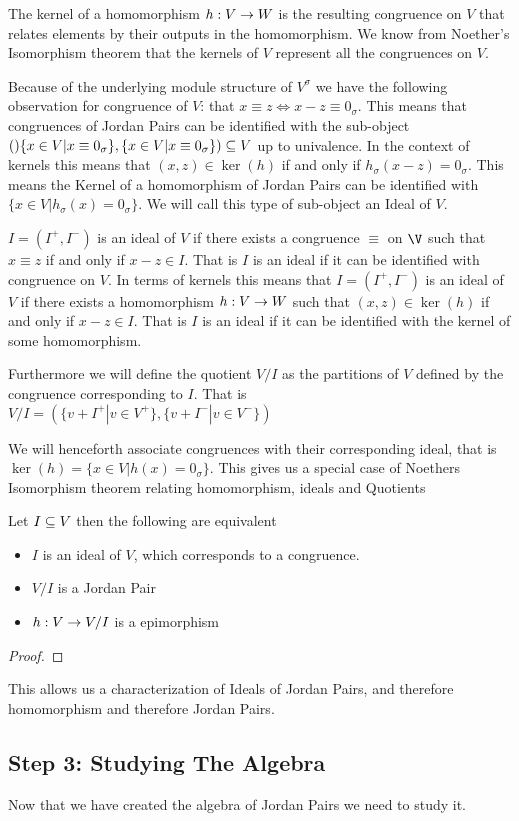 The kernel of a homomorphism $h:V\rightarrow W$ is the resulting congruence on $V$ that relates elements by their outputs in the
homomorphism. We know from Noether's Isomorphism theorem that the kernels of $V$ represent all the congruences on $V$.


Because of the underlying module structure of $V^\sigma$ we have the following observation for 
congruence of $V$: that $x\equiv z \Leftrightarrow x-z\equiv 0_\sigma$. 
This means that congruences of Jordan Pairs can be identified with the sub-object 
$()\{x\in V | x\equiv 0_\sigma\},\{x\in V | x\equiv 0_\sigma\})\subseteq V$ up to univalence. 
In the context of kernels this means that
$(x,z)\in\ker(h)$ if and only if $h_\sigma(x-z)=0_\sigma$.
This means the Kernel of a homomorphism of Jordan Pairs can be identified with 
$\{x\in V | h_\sigma(x)=0_\sigma\}$.
We will call this type of sub-object an Ideal of $V$.

\begin{definition}
    $I=(I^+,I^-)$ is an ideal of $V$ if there exists a congruence $\equiv$ on $\V$ 
    such that $x\equiv z$ if and only if $x-z\in I$. That is $I$ is an ideal if it 
    can be identified with congruence on $V$. In terms of kernels this means that 
    $I=(I^+,I^-)$ is an ideal of $V$ if there exists a homomorphism $h: V\rightarrow W$ 
    such that $(x,z)\in \ker(h)$ if and only if $x-z\in I$. That is $I$ is an ideal if it 
    can be identified with the kernel of some homomorphism. 
    
    Furthermore we will define the quotient $V/I$ as the partitions of $V$ defined by the congruence 
    corresponding to $I$. That is $V/I=(\{v+I^+|v\in V^+\},\{v+I^-|v\in V^-\})$
\end{definition}
We will henceforth associate congruences with their corresponding ideal, that is $\ker(h)=\{x\in V | h(x)=0_\sigma\}$.
This gives us a special case of Noethers Isomorphism theorem 
relating homomorphism, ideals and Quotients 
\begin{prop}
    Let $I\subseteq V$ then the following are equivalent
    \begin{itemize}
    \item $I$ is an ideal of $V$, which corresponds to a congruence.
    \item $V/I$ is a Jordan Pair
    \item $h:V\rightarrow V/I$ is a epimorphism
    \end{itemize}
\end{prop}
\begin{proof}

\end{proof}
This allows us a characterization of Ideals of Jordan Pairs, and therefore homomorphism and therefore Jordan Pairs.

\subsection{Step 3: Studying The Algebra}
Now that we have created the algebra of Jordan Pairs we need to study it.